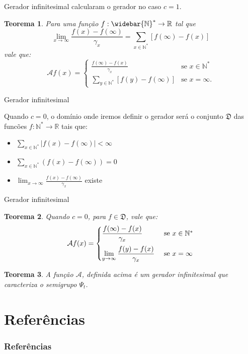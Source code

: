 \documentclass[xcolor=pdftex,dvipsnames]{beamer}
\newcommand{\AAA}{{\mathcal{A}}}
\newcommand{\DDD}{{\mathfrak{D}}}
\newcommand{\Nz}{{\mathbb{N^*}}}
\newcommand{\Nzb}{{\mathbb{\widebar{N}^*}}}
\newcommand{\R}{{\mathbb{R}}}
\newtheorem{teorema}{Teorema}
\begin{document}
\begin{frame}{Gerador infinitesimal}
  \cite{kendall:56} calcularam o gerador no caso $c = 1$.

  \begin{teorema}
  Para uma função $f: \Nzb \to \R$ tal que
  \begin{displaymath}
    \lim_{x \to \infty}
    \frac{f(x) - f(\infty)}{\gamma_x} = \sum_{x \in \Nz}
    [f(\infty) - f(x)]
  \end{displaymath}
  vale que:
  \begin{displaymath}
    \AAA f (x) = \begin{cases}
      \displaystyle
      \frac{f(\infty) - f(x)}{\gamma_x} & \text{se } x \in \Nz\\
      \displaystyle
      \sum_{y\in \Nz} [f(y) - f(\infty)] & \text{se } x = \infty.
    \end{cases}
  \end{displaymath}
\end{teorema}
\end{frame}

\begin{frame}{Gerador infinitesimal}

  Quando $c = 0$, o domínio onde iremos definir o gerador será 
  o conjunto $\DDD$ das funcões $f: \Nz \to \R$ tais que:

  \begin{itemize}
  \item $\displaystyle \sum_{x\in \Nz} |f(x)-f(\infty)| < \infty$
  \item $\displaystyle \sum_{x\in \Nz} \left( f(x)-f(\infty)\right) = 0$
  \item $\displaystyle \lim_{x \to \infty} \frac{f(x) -
      f(\infty)}{\gamma_x}$ existe
  \end{itemize}  
\end{frame}

\begin{frame}{Gerador infinitesimal}

  \begin{teorema}
    Quando $c = 0$, para $f \in \DDD$, vale que:
    \begin{displaymath}
      \AAA f (x) = \begin{cases}
        \displaystyle
        \frac{f(\infty) - f(x)}{\gamma_x} & \text{ se } x \in \Nz \vspace{2mm}\\
        \displaystyle
        \lim_{y \to \infty} \frac{f(y) - f(x)}{\gamma_x} & \text{ se } x=\infty\\
      \end{cases}
    \end{displaymath}
  \end{teorema}
  \pause
  \begin{teorema}
    A função $\AAA$, definida acima é um gerador infinitesimal que
    caracteriza o semigrupo $\Psi_t$.
  \end{teorema}
\end{frame}



\section{Referências}
\begin{frame}
  \frametitle{Referências}
   
   
\end{frame}
\end{document}
